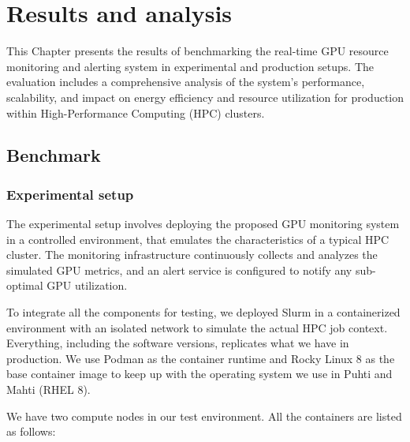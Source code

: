 \chapter{Results and analysis}
\label{chap:result}
This Chapter presents the results of benchmarking the real-time GPU resource monitoring and alerting system in experimental and production setups. The evaluation includes a comprehensive analysis of the system's performance, scalability, and impact on energy efficiency and resource utilization for production within High-Performance Computing (HPC) clusters.

\section{Benchmark}
\subsection{Experimental setup}
\label{subsection:experiment}
The experimental setup involves deploying the proposed GPU monitoring system in a controlled environment, that emulates the characteristics of a typical HPC cluster. The monitoring infrastructure continuously collects and analyzes the simulated GPU metrics, and an alert service is configured to notify any sub-optimal GPU utilization.

To integrate all the components for testing, we deployed Slurm in a containerized environment with an isolated network to simulate the actual HPC job context. Everything, including the software versions, replicates what we have in production. We use Podman as the container runtime and Rocky Linux 8 as the base container image to keep up with the operating system we use in Puhti and Mahti (RHEL 8).

We have two compute nodes in our test environment. All the containers are listed as follows:
 
